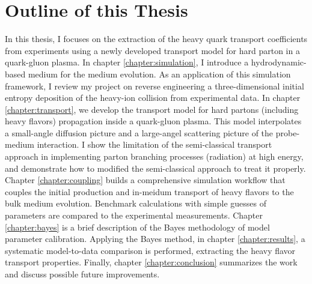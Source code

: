 \section{Outline of this Thesis}
In this thesis, I focuses on the extraction of the heavy quark transport coefficients from experiments using a newly developed transport model for hard parton in a quark-gluon plasma.
In chapter \ref{chapter:simulation}, I introduce a hydrodynamic-based medium for the medium evolution. 
As an application of this simulation framework, I review my project on reverse engineering a three-dimensional initial entropy deposition of the heavy-ion collision from experimental data. 
In chapter \ref{chapter:transport}, we develop the transport model for hard partons (including heavy flavors) propagation inside a quark-gluon plasma.
This model interpolates a small-angle diffusion picture and a large-angel scattering picture of the probe-medium interaction.
I show the limitation of the semi-classical transport approach in implementing parton branching processes (radiation) at high energy, and demonstrate how to modified the semi-classical approach to treat it properly.
Chapter \ref{chapter:coupling} builds a comprehensive simulation workflow that couples the initial production and in-meidum transport of heavy flavors to the bulk medium evolution.
Benchmark calculations with simple guesses of parameters are compared to the experimental measurements.
Chapter \ref{chapter:bayes} is a brief description of the Bayes methodology of model parameter calibration.
Applying the Bayes method, in chapter \ref{chapter:results}, a systematic model-to-data comparison is performed, extracting the heavy flavor transport properties.
Finally, chapter \ref{chapter:conclusion} summarizes the work and discuss possible future improvements.


